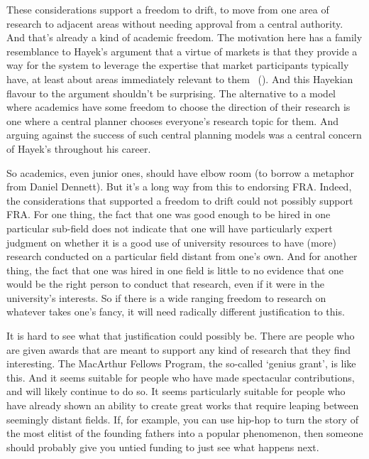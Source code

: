 \documentclass[
  11pt,
  letterpaper,
  DIV=11,
  numbers=noendperiod,
  twoside]{scrartcl}
\begin{document}
These considerations support a freedom to drift, to move from one area
of research to adjacent areas without needing approval from a central
authority. And that's already a kind of academic freedom. The motivation
here has a family resemblance to Hayek's argument that a virtue of
markets is that they provide a way for the system to leverage the
expertise that market participants typically have, at least about areas
immediately relevant to them ~().
And this Hayekian flavour to the argument shouldn't be surprising. The
alternative to a model where academics have some freedom to choose the
direction of their research is one where a central planner chooses
everyone's research topic for them. And arguing against the success of
such central planning models was a central concern of Hayek's throughout
his career.

So academics, even junior ones, should have elbow room (to borrow a
metaphor from Daniel Dennett). But it's a long way from this to
endorsing FRA. Indeed, the considerations that supported a freedom to
drift could not possibly support FRA. For one thing, the fact that one
was good enough to be hired in one particular sub-field does not
indicate that one will have particularly expert judgment on whether it
is a good use of university resources to have (more) research conducted
on a particular field distant from one's own. And for another thing, the
fact that one was hired in one field is little to no evidence that one
would be the right person to conduct that research, even if it were in
the university's interests. So if there is a wide ranging freedom to
research on whatever takes one's fancy, it will need radically different
justification to this.

It is hard to see what that justification could possibly be. There are
people who are given awards that are meant to support any kind of
research that they find interesting. The MacArthur Fellows Program, the
so-called `genius grant', is like this. And it seems suitable for people
who have made spectacular contributions, and will likely continue to do
so. It seems particularly suitable for people who have already shown an
ability to create great works that require leaping between seemingly
distant fields. If, for example, you can use hip-hop to turn the story
of the most elitist of the founding fathers into a popular phenomenon,
then someone should probably give you untied funding to just see what
happens next.
\end{document}
